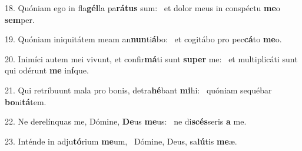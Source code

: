 18. Quóniam ego in fla\textbf{gél}la pa\textbf{rá}\textbf{tus} sum: \ast\  et dolor meus in conspéctu \textbf{me}o \textbf{sem}per.\

19. Quóniam iniquitátem meam an\textbf{nun}ti\textbf{á}bo: \ast\  et cogitábo pro pec\textbf{cá}to \textbf{me}o.\

20. Inimíci autem mei vivunt, et confir\textbf{má}ti sunt \textbf{su}\textbf{per} me: \ast\  et multiplicáti sunt qui odérunt \textbf{me} in\textbf{í}que.\

21. Qui retríbuunt mala pro bonis, detra\textbf{hé}bant \textbf{mi}hi: \ast\  quóniam sequébar \textbf{bo}ni\textbf{tá}tem.\

22. Ne derelínquas me, Dómine, \textbf{De}us \textbf{me}us: \ast\  ne di\textbf{scés}seris \textbf{a} me.\

23. Inténde in adju\textbf{tó}rium \textbf{me}um, \ast\  Dómine, Deus, sa\textbf{lú}tis \textbf{me}æ.\

